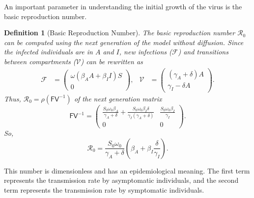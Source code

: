 \documentclass[11pt]{article}
\newcommand{\Ro}{\mathcal{R}_0}
\newcommand{\mat}[1]{\mathsf{#1}}
\newtheorem{definition}{Definition}
\begin{document}
		An important parameter in understanding the initial growth of the virus is the basic reproduction number.
		\begin{definition}[Basic Reproduction Number]
			The basic reproduction number $\Ro$ can be computed using the next generation of the model without diffusion.
			Since the infected individuals are in $A$ and $I$, new infections ($\mathcal{F}$) and transitions between compartments ($\mathcal{V}$) can be rewritten as
			\begin{align*}
				\mathcal{F} &= \begin{pmatrix} \omega (\beta_A A + \beta_I I) S \\ 0 \end{pmatrix}, &
				\mathcal{V} &= \begin{pmatrix} (\gamma_A + \delta) A \\ \gamma_I - \delta A \end{pmatrix}.
			\end{align*}
			Thus, $\Ro = \rho (\mat{F} \mat{V}^{-1})$ of the next generation matrix
			\begin{equation*}
				\mat{F} \mat{V}^{-1} = \begin{pmatrix} 
				\frac{S_0 \omega_0 \beta_A}{\gamma_A + \delta} + \frac{S_0 \omega_0 \beta_I \delta}{\gamma_I (\gamma_A + \delta)} & 
				\frac{S_0 \omega_0 \beta_I}{\gamma_I} \\ 
				0 & 0 \end{pmatrix}.
			\end{equation*}
			So,
			\begin{equation} \label{eq:ro}
				\Ro =  \frac{S_0 \omega_0}{\gamma_A + \delta}  \left( \beta_A + \beta_I \frac{\delta}{\gamma_I} \right).
			\end{equation}
		\end{definition}
		\noindent This number is dimensionless and has an epidemiological meaning.
		The first term represents the transmission rate by asymptomatic individuals, and the second term represents the transmission rate by symptomatic individuals.
			
\end{document}
